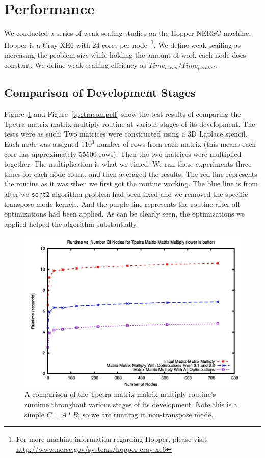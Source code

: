 \documentclass{article}
\begin{document}
\section{Performance}
We conducted a series of weak-scaling studies on the Hopper NERSC machine. Hopper is a Cray XE6 with 24 cores
per-node~\footnote{For more machine information regarding Hopper, please visit \url{http://www.nersc.gov/systems/hopper-cray-xe6}}.
We define weak-scailing as increasing the problem size while holding the amount of work each node does constant. We define
weak-scailing effciency as $Time_{serial}/Time_{parallel}$.

\subsection{Comparison of Development Stages}
Figure~\ref{tpetracomptime} and Figure~\ref{tpetracompeff} show the test results of comparing the Tpetra matrix-matrix multiply 
routine at various stages of its 
development.  The tests were as such: Two matrices were constructed using a 3D Laplace stencil. Each node was assigned 
$110^3$ number of rows from each matrix (this means each core has approximately 55500 rows). 
Then the two matrices were multiplied together. The multiplication is what 
we timed. We ran these experiments three times for each node count, and then averaged the results.
The red line represents the routine as it was when we first got the routine working. The blue line is from after 
we \verb!sort2! algorithm problem had been fixed and we removed the specific transpose mode kernels. 
And the purple line represents the routine after all optimizations had been applied.
As can be clearly seen, the optimizations we applied helped the algorithm substantially.

\begin{figure}
\includegraphics[scale=.4]{tpetratime.jpg}
\caption[Time Comparison]{A comparison of the Tpetra matrix-matrix multiply routine's runtime 
throughout various stages of its development. Note this is a simple $C=A*B$; so we are running in non-transpose mode.}
\label{tpetracomptime}
\end{figure}
\end{document}
